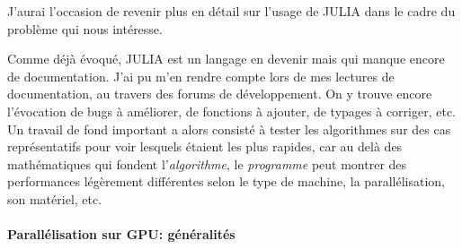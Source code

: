 \documentclass[svgnames,dvipsnames,a4paper,10pt,french]{report}
\begin{document}
J'aurai l'occasion de revenir plus en détail sur l'usage de JULIA dans le cadre du problème qui nous intéresse.



Comme déjà évoqué, JULIA est un langage en devenir mais qui manque encore de documentation. J'ai pu m'en rendre compte lors de mes lectures de documentation, au travers des forums de développement. On y trouve encore l'évocation de bugs à améliorer, de fonctions à ajouter, de typages à corriger, etc. Un travail de fond important a alors consisté à tester les algorithmes sur des cas représentatifs pour voir lesquels étaient les plus rapides, car au delà des mathématiques qui fondent l'\textit{algorithme}, le \textit{programme} peut montrer des performances légèrement différentes selon le type de machine, la parallélisation, son matériel, etc.  %








\paragraph{Parallélisation sur GPU: généralités}
\label{parallelisation_GPU}
\end{document}
